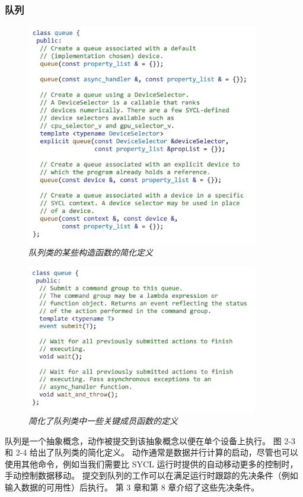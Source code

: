 \subsubsection{队列}
\begin{figure}[H]
	\centering
	\includegraphics[width=0.9\textwidth]{figs/F2.3.png}
	\caption{\textit{队列类的某些构造函数的简化定义}}
\end{figure}

\begin{figure}[H]
	\centering
	\includegraphics[width=0.9\textwidth]{figs/F2.4.png}
	\caption{\textit{简化了队列类中一些关键成员函数的定义}}
\end{figure}


队列是一个抽象概念，动作被提交到该抽象概念以便在单个设备上执行。 图 2-3 和 2-4 给出了队列类的简化定义。 
动作通常是数据并行计算的启动，尽管也可以使用其他命令，例如当我们需要比 SYCL 运行时提供的自动移动更多的控制时，
手动控制数据移动。 提交到队列的工作可以在满足运行时跟踪的先决条件（例如输入数据的可用性）后执行。 
第 3 章和第 8 章介绍了这些先决条件。


